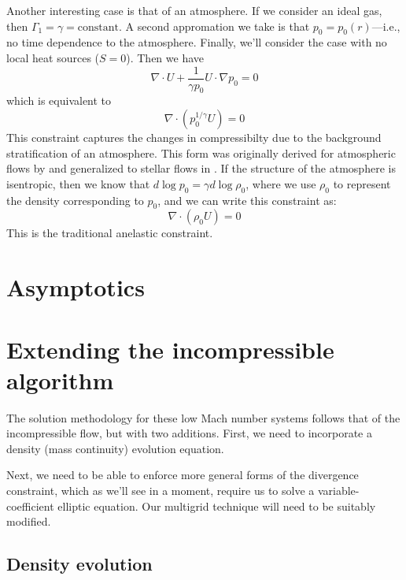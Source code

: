 Another interesting case is that of an atmosphere.  If we consider an
ideal gas, then $\Gamma_1 = \gamma = \mathrm{constant}$.  A second
appromation we take is that $p_0 = p_0(r)$---i.e., no time
dependence to the atmosphere.  Finally, we'll consider the case
with no local heat sources ($S = 0$).  Then we have
\begin{equation}
\nabla \cdot U + \frac{1}{\gamma p_0} U \cdot \nabla p_0 = 0
\end{equation}
which is equivalent to
\begin{equation}
\nabla \cdot \left ( p_0^{1/\gamma} U \right ) = 0
\end{equation}
This constraint captures the changes in compressibilty due to the 
background stratification of an atmosphere.  This form was originally
derived for atmospheric flows by \cite{durran:1989} and generalized to
stellar flows in \cite{ABRZ:I}.  If the structure of the
atmosphere is isentropic, then we know that $d\log p_0 = \gamma d\log \rho_0$,
where we use $\rho_0$ to represent the density corresponding to $p_0$, and
we can write this constraint as:
\begin{equation}
\nabla \cdot (\rho_0 U) = 0
\end{equation}
This is the traditional anelastic constraint.


\section{Asymptotics}



\section{Extending the incompressible algorithm}

The solution methodology for these low Mach number systems follows 
that of the incompressible flow, but with two additions.  First,
we need to incorporate a density (mass continuity) evolution equation.

Next, we need to be able to enforce more general forms of the 
divergence constraint, which as we'll see in a moment, require
us to solve a variable-coefficient elliptic equation.  Our
multigrid technique will need to be suitably modified.

\subsection{Density evolution}

